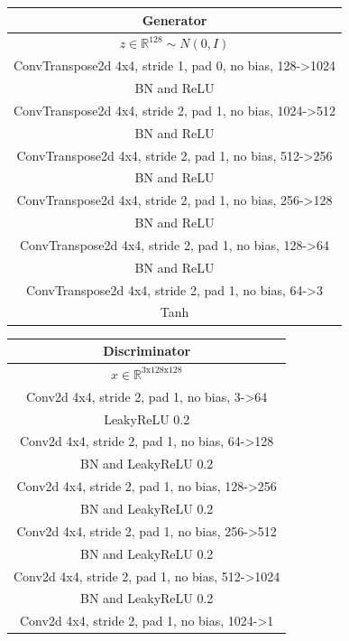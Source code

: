 \documentclass{article}
\begin{document}
\begin{tabular}{c}
	Generator \\
	\toprule\midrule
	$z \in \mathbb{R}^{128} \sim N(0,I)$ \\
	\midrule
	ConvTranspose2d 4x4, stride 1, pad 0, no bias, 128->1024 \\
	\midrule
	BN and ReLU \\
	\midrule
	ConvTranspose2d 4x4, stride 2, pad 1, no bias, 1024->512 \\
	\midrule
	BN and ReLU \\
	\midrule
	ConvTranspose2d 4x4, stride 2, pad 1, no bias, 512->256 \\
	\midrule
	BN and ReLU \\
	\midrule
	ConvTranspose2d 4x4, stride 2, pad 1, no bias, 256->128 \\
	\midrule
	BN and ReLU \\
	\midrule
	ConvTranspose2d 4x4, stride 2, pad 1, no bias, 128->64 \\
	\midrule
	BN and ReLU \\
	\midrule
	ConvTranspose2d 4x4, stride 2, pad 1, no bias, 64->3 \\
	\midrule
	Tanh \\
	\bottomrule
\end{tabular} 
\quad
\begin{tabular}{c}
	Discriminator \\
	\toprule\midrule
	$x \in \mathbb{R}^{\text{3x128x128}}$ \\
	\midrule
	Conv2d 4x4, stride 2, pad 1, no bias, 3->64 \\
	\midrule
	LeakyReLU 0.2 \\
	\midrule
	Conv2d 4x4, stride 2, pad 1, no bias, 64->128 \\
	\midrule
	BN and LeakyReLU 0.2 \\
	\midrule
	Conv2d 4x4, stride 2, pad 1, no bias, 128->256 \\
	\midrule
	BN and LeakyReLU 0.2 \\
	\midrule
	Conv2d 4x4, stride 2, pad 1, no bias, 256->512 \\
	\midrule
	BN and LeakyReLU 0.2 \\
	\midrule
	Conv2d 4x4, stride 2, pad 1, no bias, 512->1024 \\
	\midrule
	BN and LeakyReLU 0.2 \\
	\midrule
	Conv2d 4x4, stride 2, pad 1, no bias, 1024->1 \\
	\bottomrule
\end{tabular}
\end{document}
